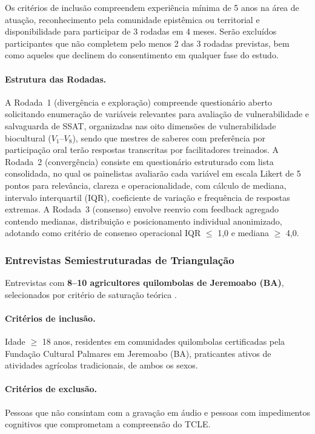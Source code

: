 \documentclass[12pt,a4paper,brazil]{article}
\begin{document}
Os critérios de inclusão compreendem experiência mínima de 5 anos na área de atuação, reconhecimento pela comunidade epistêmica ou territorial e disponibilidade para participar de 3 rodadas em 4 meses. Serão excluídos participantes que não completem pelo menos 2 das 3 rodadas previstas, bem como aqueles que declinem do consentimento em qualquer fase do estudo.

\paragraph{Estrutura das Rodadas.}

A Rodada~1 (divergência e exploração) compreende questionário aberto solicitando enumeração de variáveis relevantes para avaliação de vulnerabilidade e salvaguarda de SSAT, organizadas nas oito dimensões de vulnerabilidade biocultural ($V_1$--$V_8$), sendo que mestres de saberes com preferência por participação oral terão respostas transcritas por facilitadores treinados. A Rodada~2 (convergência) consiste em questionário estruturado com lista consolidada, no qual os painelistas avaliarão cada variável em escala Likert de 5 pontos para relevância, clareza e operacionalidade, com cálculo de mediana, intervalo interquartil (IQR), coeficiente de variação e frequência de respostas extremas. A Rodada~3 (consenso) envolve reenvio com feedback agregado contendo medianas, distribuição e posicionamento individual anonimizado, adotando como critério de consenso operacional IQR $\leq$ 1,0 e mediana $\geq$ 4,0.

\subsubsection{Entrevistas Semiestruturadas de Triangulação}

Entrevistas com \textbf{8--10 agricultores quilombolas de Jeremoabo (BA)}, selecionados por critério de saturação teórica \citep{GlaserStrauss1967}.

\paragraph{Critérios de inclusão.} Idade $\geq$ 18 anos, residentes em comunidades quilombolas certificadas pela Fundação Cultural Palmares em Jeremoabo (BA), praticantes ativos de atividades agrícolas tradicionais, de ambos os sexos.

\paragraph{Critérios de exclusão.} Pessoas que não consintam com a gravação em áudio e pessoas com impedimentos cognitivos que comprometam a compreensão do TCLE.
\end{document}
